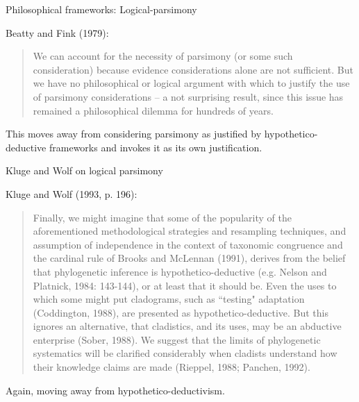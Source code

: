 \documentclass[bluish,slideColor,colorBG,pdf]{prosper}
\begin{document}
\begin{slide}[Replace]{Philosophical frameworks: Logical-parsimony}

Beatty and Fink (1979):

\begin{quote}
We can account for the necessity of parsimony (or some such consideration)
because evidence considerations alone are not sufficient.  But we have no
philosophical or logical argument with which to justify the use of
parsimony considerations -- a not surprising result, since this issue has
remained a philosophical dilemma for hundreds of years.
\end{quote}

This moves away from considering parsimony as justified by
hypothetico-deductive frameworks and invokes it as its own justification.

\end{slide}

\begin{slide}[Replace]{Kluge and Wolf on logical parsimony}

Kluge and Wolf (1993, p. 196):

\begin{quote}
Finally, we might imagine that some of the popularity of the aforementioned
methodological strategies and resampling techniques, and assumption of
independence in the context of taxonomic congruence and the cardinal rule of
Brooks and McLennan (1991), derives from the belief that phylogenetic
inference is hypothetico-deductive (e.g. Nelson and Platnick, 1984: 143-144),
or at least that it should be.  Even the uses to which some might put
cladograms, such as ``testing" adaptation (Coddington, 1988), are presented
as hypothetico-deductive.  But this ignores an alternative, that cladistics,
and its uses, may be an abductive enterprise (Sober, 1988).  We suggest that
the limits of phylogenetic systematics will be clarified considerably
when cladists understand how their knowledge claims are made (Rieppel, 1988;
Panchen, 1992).
\end{quote}

Again, moving away from hypothetico-deductivism.

\end{slide}
\end{document}
